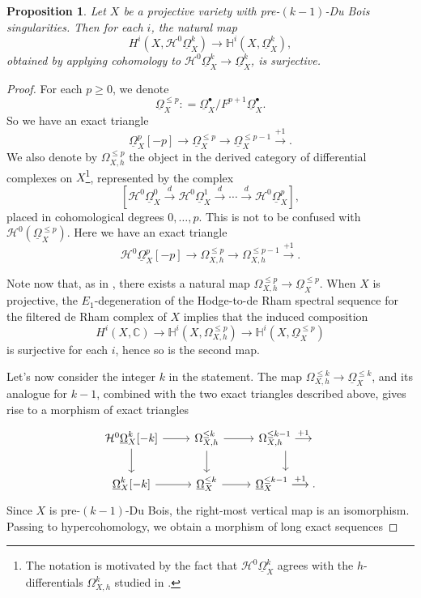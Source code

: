 \documentclass[11pt]{amsart}
\newtheorem{proposition}[equation]{Proposition}
\theoremstyle{definition}
\theoremstyle{plain}
\renewcommand{\H}{\mathcal H}
\newcommand{\CC}{\mathbb C}
\newcommand{\HH}{\mathbb H}
\newcommand{\xto}{\xrightarrow} %
\newcommand{\DB}{\underline{\Omega}} %
\begin{document}
\begin{proposition}\label{surjection}
Let $X$ be a projective variety with pre-$(k-1)$-Du Bois singularities. Then for each $i$, the natural map
$$H^i (X, \H^0 \DB_X^k) \to \HH^i (X, \DB_X^k),$$
obtained by applying cohomology to $\H^0\DB_X^k \to \DB_X^k$, is surjective.
\end{proposition}
\begin{proof}
For each $p \ge 0$, we denote 
$$\DB_X^{\le p} : = \DB_X^\bullet / F^{p + 1} \DB_X^\bullet.$$
So we have an exact triangle 
\begin{equation}\label{eq:tr1}
\DB^p_X[-p] \longrightarrow \DB_X^{\le p} \longrightarrow  \DB_X^{\le p-1} \overset{+1}\longrightarrow.
\end{equation}
We also denote by $\Omega_{X,h}^{\le p}$ the object in the derived category of differential complexes on $X$\footnote{The notation is motivated by the fact that 
	$\H^0\DB_X^k$ agrees with the $h$-differentials $\Omega_{X,h}^k$ studied in \cite{h-differential}.}, represented by the complex 
\[[\H^0\DB^0_X \xto{d} \H^0\DB^1_X \xto{d} \cdots \xto{d} \H^0\DB^p_X],\]
placed in cohomological degrees $0,\dots, p$. This is not to be confused with $\H^0 (\DB_X^{\le p})$. Here we have an exact triangle
\begin{equation}\label{eq:tr2}
\H^0 \DB^p_X[-p] \longrightarrow \Omega_{X,h}^{\le p} \longrightarrow \Omega_{X,h}^{\le p-1} \overset{+1}\longrightarrow.
\end{equation}

Note now that, as in \cite[Proposition 2.3]{SVV}, there exists a natural map 
$\Omega_{X,h}^{\le p}\to \DB_X^{\le p}$. When $X$ is projective, the $E_1$-degeneration of the Hodge-to-de Rham spectral sequence for the filtered de Rham complex of $X$ implies that the induced composition
    \[H^i(X, \CC) \to \HH^i(X, \Omega_{X,h}^{\le p}) \to \HH^i(X, \DB^{\le p}_X)\]
 is surjective for each $i$, hence so is the second map. 

Let's now consider the integer $k$ in the statement.
The map $\Omega_{X,h}^{\le k}\to \DB_X^{\le k}$, and its analogue for $k-1$, combined with the two exact triangles described above, gives rise 
to a morphism of exact triangles
\[\begin{tikzcd}
	\H^0\DB^k_X[-k] & \Omega_{X,h}^{\le k} & \Omega_{X,h}^{\le k-1}  \overset{+1}\longrightarrow \\
	\DB^k_X[-k] & \DB_X^{\le k} & \DB_X^{\le k-1}   \overset{+1}\longrightarrow.
         \arrow[from=1-1, to=1-2]
	\arrow[from=1-2, to=1-3]
	\arrow[from=2-1, to=2-2]
	\arrow[from=2-2, to=2-3]
	\arrow[from=1-1, to=2-1]
	\arrow[from=1-2, to=2-2]
	\arrow[from=1-3, to=2-3]
    \end{tikzcd}\]
Since $X$ is pre-$(k-1)$-Du Bois, the right-most vertical map is an isomorphism.  Passing to hypercohomology, we obtain a morphism of long exact sequences



\end{proof}
\end{document}
